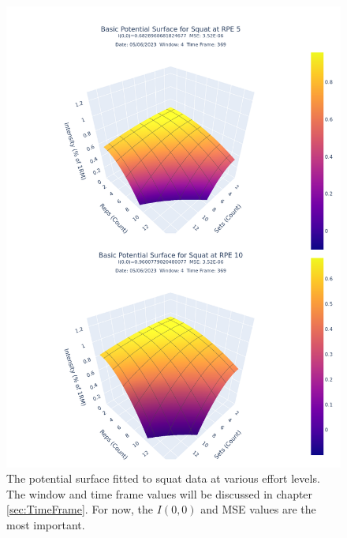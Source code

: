 \begin{figure}[htbp]
    \centering
    \includegraphics[scale=0.55]{images/ch3/PotentialSurface/DualSquat.Effort[5,10].basic.png}
    \caption{The potential surface fitted to squat data at various effort levels. The window and time frame values will be discussed in chapter \ref{sec:TimeFrame}. For now, the $I(0,0)$ and MSE values are the most important.}
    \label{fig:SquatPotentialSurfaceAcrossEffort}
\end{figure}

